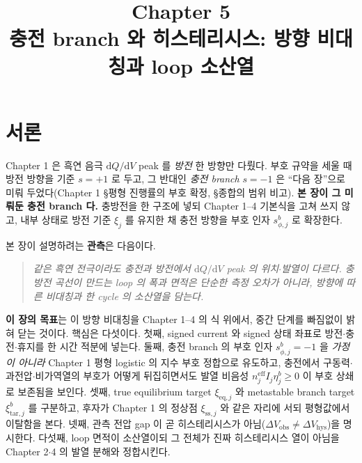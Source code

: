 \documentclass[11pt,a4paper]{article}
\title{\textbf{\LARGE Chapter 5}\\[0.35em]\Large 충전 branch 와 히스테리시스: 방향 비대칭과 loop 소산열}
\author{}
\date{}
\newcommand{\dd}{\mathrm{d}}
\newcommand{\eff}{\mathrm{eff}}
\newcommand{\eq}{\mathrm{eq}}
\newcommand{\sstat}{\mathrm{ss}}
\newcommand{\hys}{\mathrm{hys}}
\newcommand{\obs}{\mathrm{obs}}
\newcommand{\tar}{\mathrm{tar}}
\begin{document}
\maketitle

\section*{서론}
Chapter 1 은 흑연 음극 $\dd Q/\dd V$ peak 를 \emph{방전} 한 방향만 다뤘다. 부호 규약을 세울 때 방전 방향을 기준
$s=+1$ 로 두고, 그 반대인 \emph{충전 branch} $s=-1$ 은 ``다음 장''으로 미뤄 두었다(Chapter 1 \S 평형 진행률의
부호 확정, \S 종합의 범위 비고). \textbf{본 장이 그 미뤄둔 충전 branch 다.} 충방전을 한 구조에 넣되 Chapter 1--4
기본식을 고쳐 쓰지 않고, 내부 상태로 방전 기준 $\xi_j$ 를 유지한 채 충전 방향을 부호 인자 $s_{\phi,j}^b$ 로
확장한다.

본 장이 설명하려는 \textbf{관측}은 다음이다.
\begin{quote}\itshape
같은 흑연 전극이라도 충전과 방전에서 $\dd Q/\dd V$ peak 의 위치$\cdot$발열이 다르다. 충방전 곡선이 만드는
loop 의 폭과 면적은 단순한 측정 오차가 아니라, 방향에 따른 \emph{비대칭}과 한 cycle 의 \emph{소산열}을 담는다.
\end{quote}

\textbf{이 장의 목표}는 이 방향 비대칭을 Chapter 1--4 의 식 위에서, 중간 단계를 빠짐없이 밝혀 닫는 것이다.
핵심은 다섯이다. 첫째, signed current 와 signed 상태 좌표로 방전$\cdot$충전$\cdot$휴지를 한 시간 적분에 넣는다.
둘째, 충전 branch 의 부호 인자 $s_{\phi,j}^b=-1$ 을 \emph{가정이 아니라} Chapter 1 평형 logistic 의 지수 부호
정합으로 유도하고, 충전에서 구동력$\cdot$과전압$\cdot$비가역열의 부호가 어떻게 뒤집히면서도 발열 비음성
$n_j^{\eff}I_j\eta_j^b\ge0$ 이 부호 상쇄로 보존됨을 보인다. 셋째, true equilibrium target $\xi_{\eq,j}$ 와
metastable branch target $\xi_{\tar,j}^b$ 를 구분하고, 후자가 Chapter 1 의 정상점 $\xi_{\sstat,j}$ 와 같은 자리에
서되 평형값에서 이탈함을 본다. 넷째, 관측 전압 gap 이 곧 히스테리시스가 아님($\Delta V_\obs\ne\Delta V_\hys$)을
명시한다. 다섯째, loop 면적이 소산열이되 그 전체가 진짜 히스테리시스 열이 아님을 Chapter 2$\cdot$4 의 발열 분해와
정합시킨다.

\tableofcontents
\newpage

\end{document}
